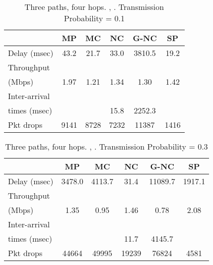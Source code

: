 \documentclass[journal, onecolumn, 12pt]{IEEEtran}
\begin{document}
\begin{table}[hb]
\begin{center}
\scriptsize
\begin{tabular}{|l|c|c|c|c|c|}
\hline
~                                    & MP & MC & NC & G-NC & SP \\ \hline
Delay (msec)   & 43.2 & 21.7 & 33.0 & 3810.5 & 19.2 \\ \hline
Throughput                   & ~  & ~  & ~  & ~         & ~  \\
(Mbps)                   & 1.97 & 1.21 & 1.34 & 1.30 & 1.42 \\ \hline
Inter-arrival              & ~  & ~  & ~  & ~         & ~  \\
times (msec)   &   &   &  15.8 & 2252.3 & \\ \hline
Pkt drops  & 9141  & 8728  & 7232  & 11387 & 1416 \\ \hline
\end{tabular}
\end{center}
\caption {Three paths, four hops. , . Transmission Probability = 0.1}
\label{tab:sim_topol_2_0.1}
\end{table}

\begin{table}[hb]
\begin{center}
\scriptsize
\begin{tabular}{|l|c|c|c|c|c|}
\hline
~                                    & MP & MC & NC & G-NC & SP \\ \hline
Delay (msec)   & 3478.0 & 4113.7 & 31.4 & 11089.7 & 1917.1 \\ \hline
Throughput                   & ~  & ~  & ~  & ~         & ~  \\
(Mbps)                   & 1.35  & 0.95 & 1.46 & 0.78 & 2.08 \\ \hline
Inter-arrival              & ~  & ~  & ~  & ~         & ~  \\
times (msec)   &   &   &  11.7 & 4145.7 & \\ \hline
Pkt drops  & 44664  & 49995  & 19239  & 76824 & 4581 \\ \hline
\end{tabular}
\end{center}
\caption {Three paths, four hops. , . Transmission Probability = 0.3}
\label{tab:sim_topol_2_0.3}
\end{table}
\end{document}
